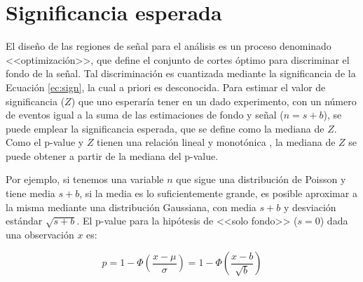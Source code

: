 
 

\section{Significancia esperada}\label{sec:exp_sig}

El diseño de las regiones de señal para el análisis es un proceso denominado <<optimización>>, que define el conjunto de cortes óptimo para discriminar el fondo de la señal. Tal discriminación es cuantizada mediante la significancia de la Ecuación \ref{ec:sign}, la cual a priori es desconocida. Para estimar el valor de significancia ($Z$) que uno esperaría tener en un dado experimento, con un número de eventos igual a la suma de las estimaciones de fondo y señal ($n=s+b$), se puede emplear la significancia esperada, que se define como la mediana de $Z$. Como el p-value y $Z$ tienen una relación lineal y monotónica \cite{Cowan:2010js}, la mediana de $Z$ se puede obtener a partir de la mediana del p-value.


Por ejemplo, si tenemos una variable $n$ que sigue una distribución de Poisson y tiene media $s+b$, si la media es lo suficientemente grande, es posible aproximar a la misma mediante una distribución Gaussiana, con media $s+b$ y desviación estándar $\sqrt{s+b}$. El p-value para la hipótesis de <<solo fondo>> ($s=0$) dada una observación $x$ es:

\begin{equation}
	p = 1 - \Phi\left( \frac{x-\mu}{\sigma} \right) = 1 - \Phi\left( \frac{x-b}{\sqrt{b}} \right)
\end{equation}

